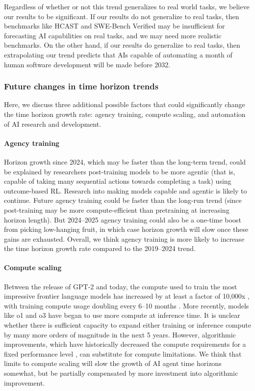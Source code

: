\documentclass{article}
\newcommand{\gabenchmark}{HCAST}
\begin{document}
Regardless of whether or not this trend generalizes to real world tasks, we believe our results to be significant. If our results do not generalize to real tasks, then benchmarks like \gabenchmark{} and SWE-Bench Verified may be insufficient for forecasting AI capabilities on real tasks, and we may need more realistic benchmarks. On the other hand, if our results do generalize to real tasks, then extrapolating our trend predicts that AIs capable of automating a month of human software development will be made before 2032.

\subsubsection{Future changes in time horizon trends}

Here, we discuss three additional possible factors that could significantly change the time horizon growth rate: agency training, compute scaling, and automation of AI research and development. 

\paragraph{Agency training} Horizon growth since 2024, which may be faster than the long-term trend, could be explained by researchers post-training models to be more agentic (that is, capable of taking many sequential actions towards completing a task) using outcome-based RL. Research into making models capable and agentic is likely to continue. Future agency training could be faster than the long-run trend (since post-training may be more compute-efficient than pretraining at increasing horizon length). But 2024--2025 agency training could also be a one-time boost from picking low-hanging fruit, in which case horizon growth will slow once these gains are exhausted. Overall, we think agency training is more likely to increase the time horizon growth rate compared to the 2019--2024 trend.

\paragraph{Compute scaling} Between the release of GPT-2 and today, the compute used to train the most impressive frontier language models has increased by at least a factor of 10,000x \cite{EpochNotableModels2024}, with training compute usage doubling every 6--10 months \cite{sevilla2022compute}. More recently, models like o1 and o3 have began to use more compute at inference time. It is unclear whether there is sufficient capacity to expand either training or inference compute by many more orders of magnitude in the next 5 years. However, algorithmic improvements, which have historically decreased the compute requirements for a fixed performance level \citep{erdil2023algorithmicprogresscomputervision} \citep{ho2024algorithmicprogresslanguagemodels}, can substitute for compute limitations. We think that limits to compute scaling will slow the growth of AI agent time horizons somewhat, but be partially compensated by more investment into algorithmic improvement.
\end{document}
